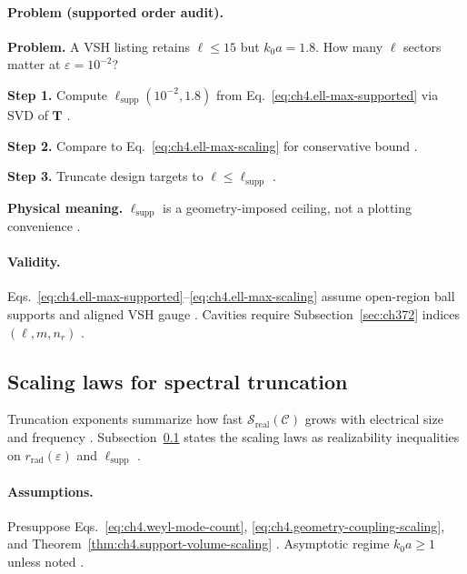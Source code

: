 \paragraph{Problem (supported order audit).}
\textbf{Problem.} A VSH listing retains \(\ell\le15\) but \(k_{0}a=1.8\). How many \(\ell\) sectors matter at \(\varepsilon=10^{-2}\)?

\textbf{Step 1.} Compute \(\ell_{\mathrm{supp}}(10^{-2},1.8)\) from Eq.~\eqref{eq:ch4.ell-max-supported} via SVD of \(\mathbf{T}\)
\cite{harrington2001}.

\textbf{Step 2.} Compare to Eq.~\eqref{eq:ch4.ell-max-scaling} for conservative bound \cite{hansen1988,jackson1999}.

\textbf{Step 3.} Truncate design targets to \(\ell\le\ell_{\mathrm{supp}}\) \cite{devaney2004,stratton1941}.

\textbf{Physical meaning.} \(\ell_{\mathrm{supp}}\) is a geometry-imposed ceiling, not a plotting convenience \cite{hansen1988}.

\paragraph{Validity.}
Eqs.~\eqref{eq:ch4.ell-max-supported}--\eqref{eq:ch4.ell-max-scaling} assume open-region ball supports and aligned VSH gauge
\cite{stratton1941,hansen1988}. Cavities require Subsection~\ref{sec:ch372} indices \((\ell,m,n_{r})\) \cite{harrington2001}.


\subsection{Scaling laws for spectral truncation}
\label{sec:ch462}

Truncation exponents summarize how fast \(\mathcal{S}_{\mathrm{real}}(\mathcal{C})\) grows with electrical size and frequency
\cite{stratton1941,jackson1999,hansen1988}. Subsection~\ref{sec:ch462} states the scaling laws as realizability inequalities on
\(r_{\mathrm{rad}}(\varepsilon)\) and \(\ell_{\mathrm{supp}}\) \cite{harrington2001,devaney2004}.

\paragraph{Assumptions.}
Presuppose Eqs.~\eqref{eq:ch4.weyl-mode-count}, \eqref{eq:ch4.geometry-coupling-scaling}, and
Theorem~\ref{thm:ch4.support-volume-scaling} \cite{stratton1941,hansen1988}. Asymptotic regime \(k_{0}a\ge1\) unless noted
\cite{jackson1999}.


